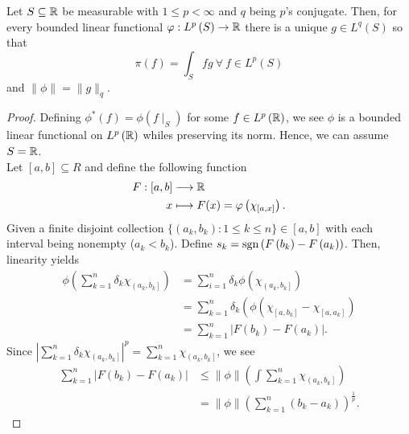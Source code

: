 \begin{theorem}
Let \( S \subseteq \mathbb{R}\) 	be measurable with \(1 \le p < \infty\) and \(q\) being \(p\)'s conjugate. Then, for every bounded linear functional \(  \varphi: L^{p}\left( S \right)  \to \mathbb{R}\) there is a unique \(g \in L^{q}\left( S \right) \) so that \[
\pi\left( f \right) = \int_{S}fg   \ \forall  \ f \in L^{p}\left( S \right)
\] and \(\| \phi\| = \|g\|_{q}\).
\end{theorem}
\begin{proof}
	Defining \( \phi^{*}\left( f \right) = \phi \left( f \mid_{S} \right) \) for some \(f \in L^{p}\left( \mathbb{R} \right) \), we see \( \phi\) is a bounded linear functional on \(L^{p}\left( \mathbb{R} \right) \) whiles preserving its norm. Hence, we can assume \(S = \mathbb{R}\).\\
Let \(\left[ a, b \right]  \subseteq R\) and define the following function \begin{align*}
	F: \left[ a, b \right]  &\longrightarrow \mathbb{R} \\
	x &\longmapsto F(x) = \varphi\left( \chi_{\left[ a, x \right] } \right)
.\end{align*}
Given a finite disjoint collection \(\{\left( a_{k}, b_{k} \right) : 1 \le k \le n\} \in \left[ a, b \right]  \) with each interval being nonempty (\(a_{k} < b_{k}\)). Define \(s_{k} = \operatorname{sgn}\left( F\left( b_{k} \right) - F\left( a_{k} \right)  \right) \). Then, linearity yields
\begin{align*}
	\phi\left( \sum_{k= 1}^{n} \delta_{k} \chi_{\left( a_{k}, b_{k} \right] } \right) &=  \sum_{i= 1}^{n} \delta_{k} \phi\left( \chi_{\left( a_{k}, b_{k} \right] } \right)  \\
	&=  \sum_{k= 1}^{n} \delta_{k} \left( \phi\left( \chi_{\left[ a, b_{k} \right] }  - \chi_{\left[ a, a_{k} \right] }  \right)  \\
		&= \sum_{k= 1}^{n} \left| F\left( b_{k} \right)  - F\left( a_{k} \right)  \right|
.\end{align*}
Since \(\left| \sum_{k=1}^{n} \delta_{k} \chi_{\left( a_{k}, b_{k} \right] } \right|^{p} = \sum_{k=1}^{n} \chi_{\left( a_{k}, b_{k} \right] } \), we see
\begin{align*}
	\sum_{k=1}^{n} \left| F\left( b_{k} \right)  - F\left( a_{k} \right)  \right| &\le \| \phi\| \left( \int \sum_{k=1}^{n} \chi_{\left( a_{k}, b_{k} \right] } \right) \\
										      &= \| \phi\| \left( \sum_{k=1}^{n} \left( b_{k} - a_{k} \right)  \right)^{\frac{1}{p}}
.\end{align*}

\end{proof}
